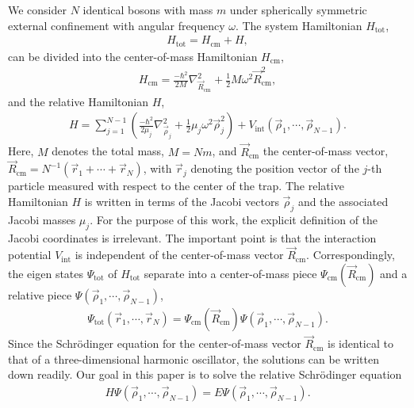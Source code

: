 \documentclass[aps,pra,twocolumn,showpacs,superscriptaddress]{revtex4}
\begin{document}
We consider $N$ identical bosons with mass $m$ under
spherically symmetric external confinement
with angular frequency $\omega$.
The system Hamiltonian $H_{\text{tot}}$,
\begin{eqnarray}
H_{\text{tot}}=H_{\text{cm}} + H,
\end{eqnarray}
can be divided into the center-of-mass Hamiltonian $H_{\text{cm}}$,
\begin{eqnarray}
H_{\text{cm}} = \frac{-\hbar^2}{2M} \nabla_{\vec{R}_{\text{cm}}}^2 + \frac{1}{2}
M \omega^2 \vec{R}_{\text{cm}}^2,
\end{eqnarray}
and the relative Hamiltonian $H$,
\begin{eqnarray}
H = \sum_{j=1}^{N-1} \left( \frac{-\hbar^2}{2 \mu_j} \nabla_{\vec{\rho}_j}^2
+ 
\frac{1}{2} \mu_j \omega^2 \vec{\rho}_j^2 \right)
+ V_{\text{int}}(\vec{\rho}_1,\cdots,\vec{\rho}_{N-1}).
\end{eqnarray}
Here, $M$ denotes the total mass, $M=Nm$, and $\vec{R}_{\text{cm}}$
the center-of-mass vector,
$\vec{R}_{\text{cm}} = N^{-1} (\vec{r}_1+\cdots+\vec{r}_N)$,
with $\vec{r}_j$ denoting the position
vector of the $j$-th particle measured with respect 
to the center of the trap.
The relative Hamiltonian $H$ is written in terms of the
Jacobi vectors $\vec{\rho}_j$ and the associated 
Jacobi masses $\mu_j$.
For the purpose of this work, the 
explicit definition of the Jacobi coordinates is
irrelevant.
The important point is that the interaction potential
$V_{\text{int}}$
is independent of the center-of-mass vector $\vec{R}_{\text{cm}}$.
Correspondingly, the eigen states $\Psi_{\text{tot}}$ of $H_{\text{tot}}$
separate into a center-of-mass piece $\Psi_{\text{cm}}(\vec{R}_{\text{cm}})$
and a relative piece
$\Psi(\vec{\rho}_1,\cdots,\vec{\rho}_{N-1})$,
\begin{eqnarray}
\Psi_{\text{tot}}(\vec{r}_1,\cdots,\vec{r}_N)=
\Psi_{\text{cm}}(\vec{R}_{\text{cm}}) \Psi(\vec{\rho}_1,\cdots,\vec{\rho}_{N-1}).
\end{eqnarray}
Since the Schr\"odinger equation for the center-of-mass vector $\vec{R}_{\text{cm}}$
is identical to that of a three-dimensional harmonic oscillator, the
solutions can be written down readily.
Our goal in this paper is to solve the relative Schr\"odinger equation
\begin{eqnarray}
H \Psi(\vec{\rho}_1,\cdots,\vec{\rho}_{N-1}) = 
E \Psi(\vec{\rho}_1,\cdots,\vec{\rho}_{N-1}).
\end{eqnarray}
\end{document}
